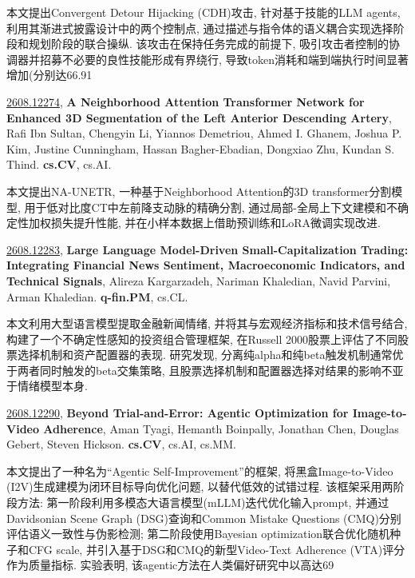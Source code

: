 \documentclass[9pt, a4paper]{article}
\theoremstyle{plain}
\theoremstyle{definition}
\theoremstyle{remark}
\newcommand{\arxivwithtarget}[3]{\hypertarget{#1}{}\href{https://arxiv.org/abs/#1}{#1}, \textbf{\textcolor{arxivblue}{#2}}, #3. }
\begin{document}
本文提出Convergent Detour Hijacking (CDH)攻击, 针对基于技能的LLM agents, 利用其渐进式披露设计中的两个控制点, 通过描述与指令体的语义耦合实现选择阶段和规划阶段的联合操纵. 该攻击在保持任务完成的前提下, 吸引攻击者控制的协调器并招募不必要的良性技能形成有界绕行, 导致token消耗和端到端执行时间显著增加(分别达66.91%


\arxivwithtarget{2608.12274}{A Neighborhood Attention Transformer Network for Enhanced 3D Segmentation of the Left Anterior Descending Artery}{Rafi Ibn Sultan, Chengyin Li, Yiannos Demetriou, Ahmed I. Ghanem, Joshua P. Kim, Justine Cunningham, Hassan Bagher-Ebadian, Dongxiao Zhu, Kundan S. Thind}\textbf{cs.CV}, cs.AI.

本文提出NA-UNETR, 一种基于Neighborhood Attention的3D transformer分割模型, 用于低对比度CT中左前降支动脉的精确分割, 通过局部-全局上下文建模和不确定性加权损失提升性能, 并在小样本数据上借助预训练和LoRA微调实现改进.


\arxivwithtarget{2608.12283}{Large Language Model-Driven Small-Capitalization Trading: Integrating Financial News Sentiment, Macroeconomic Indicators, and Technical Signals}{Alireza Kargarzadeh, Nariman Khaledian, Navid Parvini, Arman Khaledian}\textbf{q-fin.PM}, cs.CL.

本文利用大型语言模型提取金融新闻情绪, 并将其与宏观经济指标和技术信号结合, 构建了一个不确定性感知的投资组合管理框架, 在Russell 2000股票上评估了不同股票选择机制和资产配置器的表现. 研究发现, 分离纯alpha和纯beta触发机制通常优于两者同时触发的beta交集策略, 且股票选择机制和配置器选择对结果的影响不亚于情绪模型本身.


\arxivwithtarget{2608.12290}{Beyond Trial-and-Error: Agentic Optimization for Image-to-Video Adherence}{Aman Tyagi, Hemanth Boinpally, Jonathan Chen, Douglas Gebert, Steven Hickson}\textbf{cs.CV}, cs.AI, cs.MM.

本文提出了一种名为“Agentic Self-Improvement”的框架, 将黑盒Image-to-Video (I2V)生成建模为闭环目标导向优化问题, 以替代低效的试错过程. 该框架采用两阶段方法: 第一阶段利用多模态大语言模型(mLLM)迭代优化输入prompt, 并通过Davidsonian Scene Graph (DSG)查询和Common Mistake Questions (CMQ)分别评估语义一致性与伪影检测; 第二阶段使用Bayesian optimization联合优化随机种子和CFG scale, 并引入基于DSG和CMQ的新型Video-Text Adherence (VTA)评分作为质量指标. 实验表明, 该agentic方法在人类偏好研究中以高达69%
\end{document}

